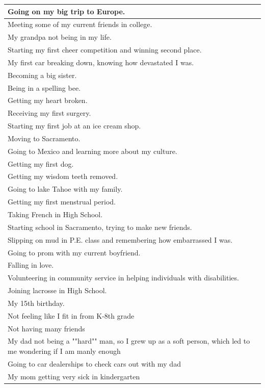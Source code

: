 \documentclass[
  .7em,
  letterpaper,
  DIV=11,
  numbers=noendperiod]{scrartcl}
\begin{document}
\begin{table}
\begin{tabular}{l}
\hline
Going on my big trip to Europe.\\
\hline
Meeting some of my current friends in college.\\
\hline
My grandpa not being in my life.\\
\hline
Starting my first cheer competition and winning second place.\\
\hline
My first car breaking down, knowing how devastated I was.\\
\hline
Becoming a big sister.\\
\hline
Being in a spelling bee.\\
\hline
Getting my heart broken.\\
\hline
Receiving my first surgery.\\
\hline
Starting my first job at an ice cream shop.\\
\hline
Moving to Sacramento.\\
\hline
Going to Mexico and learning more about my culture.\\
\hline
Getting my first dog.\\
\hline
Getting my wisdom teeth removed.\\
\hline
Going to lake Tahoe with my family.\\
\hline
Getting my first menstrual period.\\
\hline
Taking French in High School.\\
\hline
Starting school in Sacramento, trying to make new friends.\\
\hline
Slipping on mud in P.E. class and remembering how embarrassed I was.\\
\hline
Going to prom with my current boyfriend.\\
\hline
Falling in love.\\
\hline
Volunteering in community service in helping individuals with disabilities.\\
\hline
Joining lacrosse in High School.\\
\hline
My 15th birthday.\\
\hline
Not feeling like I fit in from K-8th grade\\
\hline
Not having many friends\\
\hline
My dad not being a ""hard"" man, so I grew up as a soft person, which led to me wondering if I am manly enough\\
\hline
Going to car dealerships to check cars out with my dad\\
\hline
My mom getting very sick in kindergarten\\

\end{tabular}
\end{table}
\end{document}
